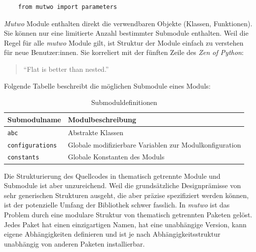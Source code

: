 \documentclass[12pt,a4paper,ngerman]{article}
\begin{document}
\lstset{language=Python}

\begin{lstlisting}
    from mutwo import parameters
\end{lstlisting}

\emph{Mutwo} Module enthalten direkt die verwendbaren Objekte (Klassen, Funktionen).
Sie können nur eine limitierte Anzahl bestimmter Submodule enthalten.
Weil die Regel für alle \emph{mutwo} Module gilt, ist Struktur der Module einfach zu verstehen für neue Benutzer:innen.
Sie korreliert mit der fünften Zeile des \emph{Zen of Python}:

\begin{quote}
    ``Flat is better than nested.''~\parencite{theZenOfPython}
\end{quote}

Folgende Tabelle beschreibt die möglichen Submodule eines Moduls:

\begin{table}[H]
    \begin{center}
        \begin{tabular}{l l} 
            \hline
            Submodulname & Modulbeschreibung \\ [0.5ex] 
            \hline\hline
            \texttt{abc} & Abstrakte Klassen \\  %
            \texttt{configurations} & Globale modifizierbare Variablen zur Modulkonfiguration \\
            \texttt{constants} & Globale Konstanten des Moduls \\
            \hline
        \end{tabular}
    \end{center}

    \caption{Submoduldefinitionen}
\end{table}

Die Strukturierung des Quellcodes in thematisch getrennte Module und Submodule ist aber unzureichend.
Weil die grundsätzliche Designprämisse von sehr generischen Strukturen ausgeht, die aber präzise spezifiziert werden können, ist der potenzielle Umfang der Bibliothek schwer fasslich.
In \emph{mutwo} ist das Problem durch eine modulare Struktur von thematisch getrennten Paketen gelöst.
Jedes Paket hat einen einzigartigen Namen, hat eine unabhängige Version, kann eigene Abhängigkeiten definieren und ist je nach Abhängigkeitsstruktur unabhängig von anderen Paketen installierbar.
\end{document}
